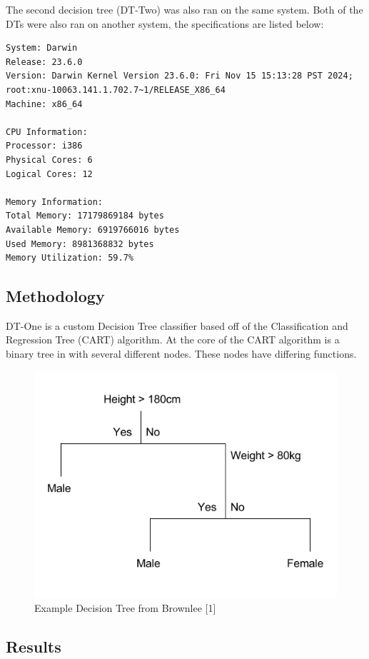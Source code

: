 \documentclass[
]{article}
\begin{document}
The second decision tree (DT-Two) was also ran on the same system. Both
of the DTs were also ran on another system, the specifications are
listed below:

\begin{verbatim}
System: Darwin
Release: 23.6.0
Version: Darwin Kernel Version 23.6.0: Fri Nov 15 15:13:28 PST 2024;
root:xnu-10063.141.1.702.7~1/RELEASE_X86_64
Machine: x86_64

CPU Information:
Processor: i386
Physical Cores: 6
Logical Cores: 12

Memory Information:
Total Memory: 17179869184 bytes
Available Memory: 6919766016 bytes
Used Memory: 8981368832 bytes
Memory Utilization: 59.7%
\end{verbatim}

\subsection{Methodology}\label{methodology}

DT-One is a custom Decision Tree classifier based off of the
Classification and Regression Tree (CART) algorithm. At the core of the
CART algorithm is a binary tree in with several different nodes. These
nodes have differing functions.

\begin{figure}
\centering
\includegraphics{Example-Decision-Tree.png}
\caption{Example Decision Tree from Brownlee {[}1{]}}
\end{figure}

\subsection{Results}\label{results}
\end{document}
